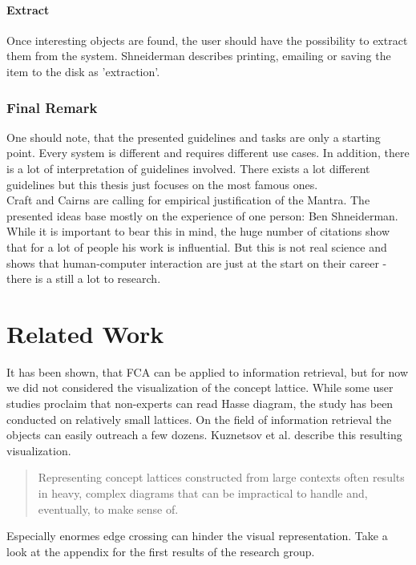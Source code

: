 \documentclass[11pt]{report}
\begin{document}
\subsubsection{Extract}

Once interesting objects are found, the user should have the possibility to extract them from the system. Shneiderman describes printing, emailing or saving the item to the disk as 'extraction'. 

\subsection{Final Remark}

One should note, that the presented guidelines and tasks are only a starting point. Every system is different and requires different use cases. In addition, there is a lot of interpretation of guidelines involved. There exists a lot different guidelines but this thesis just focuses on the most famous ones.\\

 Craft and Cairns \cite{Craft2005} are calling for empirical justification of the Mantra. The presented ideas base mostly on the experience of one person: Ben Shneiderman. While it is important to bear this in mind, the huge number of citations show that for a lot of people his work is influential. But this is not real science and shows that human-computer interaction are just at the start on their career - there is a still a lot to research.

\chapter{Related Work}

It has been shown, that FCA can be applied to information retrieval, but for now we did not considered the visualization of the concept lattice. While some user studies proclaim that non-experts can read Hasse diagram\cite{Eklund2004}, the study has been conducted on relatively small lattices. On the field of information retrieval the objects can easily outreach a few dozens. Kuznetsov et al. \cite{Kuznetsov20072}  describe this resulting visualization.
\begin{quote}
Representing concept lattices constructed from large contexts often results in heavy, complex diagrams that can be impractical to handle and, eventually, to make sense of.	
\end{quote}
Especially enormes edge crossing can hinder the visual representation. Take a look at the appendix for the first results of the research group. 
\end{document}
